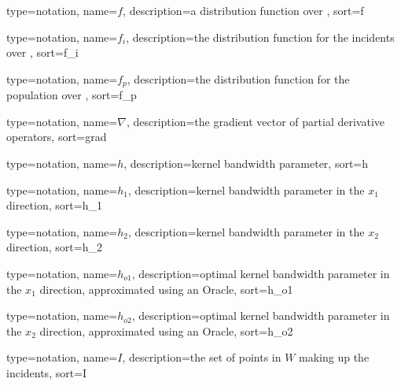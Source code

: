 

{%
   type=notation,
   name={\ensuremath{f}},
   description={a distribution function over },
   sort={f}
}

{%
   type=notation,
   name={\ensuremath{f_i}},
   description={the distribution function for the incidents over },
   sort={f_i}
}

{%
   type=notation,
   name={\ensuremath{f_p}},
   description={the distribution function for the population over },
   sort={f_p}
}

{%
   type=notation,
   name={\ensuremath{\nabla}},
   description={the gradient vector of partial derivative operators},
   sort={grad}
}

{%
   type=notation,
   name={\ensuremath{h}},
   description={kernel bandwidth parameter},
   sort={h}
}

{%
   type=notation,
   name={\ensuremath{h_1}},
   description={kernel bandwidth parameter in the \ensuremath{x_1} direction},
   sort={h_1}
}

{%
   type=notation,
   name={\ensuremath{h_2}},
   description={kernel bandwidth parameter in the \ensuremath{x_2} direction},
   sort={h_2}
}

{%
   type=notation,
   name={\ensuremath{h_{o1}}},
   description={optimal kernel bandwidth parameter in the \ensuremath{x_1} direction, approximated using an Oracle},
   sort={h_o1}
}

{%
   type=notation,
   name={\ensuremath{h_{o2}}},
   description={optimal kernel bandwidth parameter in the \ensuremath{x_2} direction, approximated using an Oracle},
   sort={h_o2}
}

{%
   type=notation,
   name={\ensuremath{I}},
   description={the set of points in \ensuremath{W} making up the incidents},
   sort={I}
}

